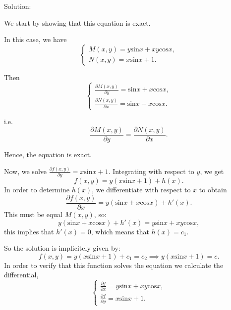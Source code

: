 \documentclass{article}
\begin{document}
		Solution:
		
		We start by showing that this equation is exact.

		In this case, we have   
		\begin{equation*}
			\begin{cases}
				M(x,y) = y\text{sin}x + xy\text{cos}x,
				\\
				N(x,y) = x\text{sin}x + 1.
			\end{cases}
		\end{equation*}
	
		Then
		\begin{equation*}
			\begin{cases}
				\frac{\partial M(x,y)}{\partial y} = \text{sin}x + x\text{cos}x,
				\\
				\frac{\partial N(x,y)}{\partial x} = \text{sin}x + x\text{cos}x.
			\end{cases}
		\end{equation*}
		
		
	
		i.e. \[ \frac{\partial M(x,y)}{\partial y} = \frac{\partial N(x,y)}{\partial x}.\]

		Hence, the equation is exact.

		Now, we solve $\frac{\partial f(x,y)}{\partial y} = x\text{sin}x + 1$. 
		Integrating with respect to $y$, we get
		\[f(x,y) = y(x\text{sin}x +1) + h(x).\]
		In order to determine $h(x)$, we differentiate with
		respect to $x$ to obtain
		\[\frac{\partial f(x,y)}{\partial x} = y(\text{sin}x+x\text{cos}x) + h'(x).\]
		This must be equal $M(x,y)$, so:
		\[y(\text{sin}x+x\text{cos}x) + h'(x) = y\text{sin}x + xy\text{cos}x,\]
		this implies that $h'(x)=0$, which means that $h(x) = c_1$.
		
		So the solution is implicitely given by:
		\[ f(x,y) = y(x\text{sin}x +1) + c_1 = c_2 \implies y(x\text{sin}x +1) = c.\]
		In order to verify that this function solves the equation we calculate the differential,
		\begin{equation*}
			\begin{cases}
				\frac{\partial f}{\partial x} = y\text{sin}x + xy\text{cos}x,
				\\
				\frac{\partial f}{\partial y} = x\text{sin}x + 1.
			\end{cases}
		\end{equation*}
\end{document}
